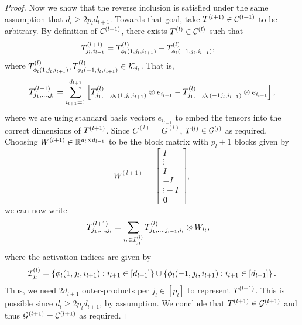 \begin{proof}
    Now we show that the reverse inclusion is satisfied under
    the same assumption that \( d_{l} \geq 2 p_l d_{l+1} \).
    Towards that goal, take
    \( T^{(l+1)} \in \mathcal{C}^{(l+1)} \) to be arbitrary.
    By definition of \( \mathcal{C}^{(l+1)} \), there exists
    \( T^{(l)} \in \mathcal{C}^{(l)} \) such that
    \begin{align*}
        T^{(l+1)}_{j_l, i_{l+1}}
         & = T^{(l)}_{ \phi_l(1, j_l, i_{l+1})} - T^{(l)}_{ \phi_l(-1, j_l, i_{l+1})},
    \end{align*}
    where \( T^{(l)}_{ \phi_l(1, j_l, i_{l+1})}, T^{(l)}_{ \phi_l(-1, j_l, i_{l+1})}
    \in \mathcal{K}_{j_l} \).
    That is,
    \[
        T^{(l+1)}_{j_1, \ldots, j_l}
        = \sum_{i_{l+1}=1}^{d_{l+1}}
        \begin{bmatrix}
            T^{(l)}_{j_1, \ldots,  \phi_l(1, j_l, i_{l+1})} \otimes e_{i_{l+1}}
            - T^{(l)}_{j_1, \ldots,  \phi_l(-1 j_l, i_{l+1})} \otimes e_{i_{l+1}}
        \end{bmatrix},
    \]
    where we are using standard basis vectors \( e_{i_{l+1}} \) to embed
    the tensors into the correct dimensions of \( T^{(l+1)} \).
    Since \( C^{(l)} = G^{(l)} \),
    \( T^{(l)} \in \mathcal{G}^{(l)} \) as required.
    Choosing \( W^{(l+1)} \in \mathbb{R}^{d_{l} \times d_{l+1}} \) to be the block matrix
    with \( p_l + 1 \) blocks given by
    \[
        W^{(l+1)}
        =
        \begin{bmatrix}
            I      \\
            \vdots \\
            I      \\
            -I     \\
            \vdots
            -I     \\
            \mathbf{0}
        \end{bmatrix},
    \]
    we can now write
    \begin{align*}
        T^{(l+1)}_{j_1, \ldots, j_{l}}
         & = \sum_{i_{l} \in \mathcal{I}_{j_l}^{(l)}}
        T^{(l)}_{j_1, \ldots, j_{l-1}, i_l}
        \otimes W_{i_{l}},
    \end{align*}
    where the activation indices are given by
    \[
        \mathcal{I}_{j_l}^{(l)}
        = \left\{ \phi_l(1, j_l, i_{l+1}) : i_{l+1} \in [d_{l+1}]\right\}
        \cup
        \left\{ \phi_l(-1, j_l, i_{l+1}) : i_{l+1} \in [d_{l+1}]\right\}.
    \]
    Thus, we need \( 2 d_{l+1} \) outer-products per \( j_l \in [p_l] \) to
    represent \( T^{(l+1)} \).
    This is possible since \( d_l \geq 2 p_l d_{l+1} \),
    by assumption.
    We conclude that \( T^{(l+1)} \in \mathcal{G}^{(l+1)} \) and thus \( \mathcal{G}^{(l+1)} = \mathcal{C}^{(l+1)} \)
    as required.
\end{proof}

